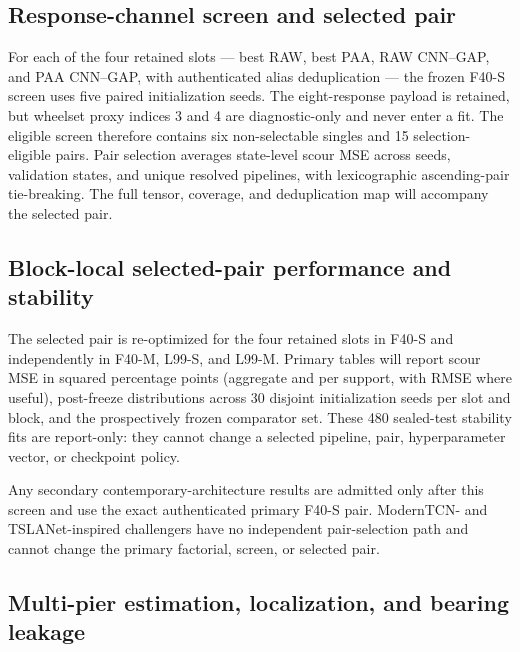 \subsection{Response-channel screen and selected pair}
\label{sec:selection_results}

For each of the four retained slots --- best RAW, best PAA, RAW CNN--GAP, and
PAA CNN--GAP, with authenticated alias deduplication --- the frozen F40-S
screen uses five paired initialization seeds. The eight-response payload is
retained, but wheelset
proxy indices 3 and 4 are diagnostic-only and never enter a fit. The eligible
screen therefore contains six non-selectable singles and 15 selection-eligible
pairs. Pair selection averages state-level scour MSE across seeds, validation
states, and unique resolved pipelines, with lexicographic ascending-pair
tie-breaking. The full tensor, coverage, and deduplication map will accompany
the selected pair.

\subsection{Block-local selected-pair performance and stability}
\label{sec:block_results}

The selected pair is re-optimized for the four retained slots in F40-S and
independently in F40-M, L99-S, and L99-M. Primary tables will report scour MSE
in squared percentage points (aggregate and per support, with RMSE where
useful), post-freeze distributions across 30 disjoint initialization seeds per
slot and block, and the prospectively frozen comparator set. These 480
sealed-test stability fits are report-only: they cannot change a selected
pipeline, pair, hyperparameter vector, or checkpoint policy.

Any secondary contemporary-architecture results are admitted only after this
screen and use the exact authenticated primary F40-S pair. ModernTCN- and
TSLANet-inspired challengers have no independent pair-selection path and cannot
change the primary factorial, screen, or selected pair.

\subsection{Multi-pier estimation, localization, and bearing leakage}
\label{sec:multipier_results}

